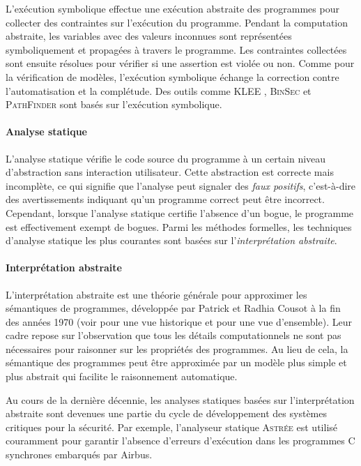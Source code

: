 {L'exécution symbolique  effectue une exécution abstraite des programmes pour collecter des contraintes sur l'exécution du programme. Pendant la computation abstraite, les variables avec des valeurs inconnues sont représentées symboliquement et propagées à travers le programme. Les contraintes collectées sont ensuite résolues pour vérifier si une assertion est violée ou non. Comme pour la vérification de modèles, l'exécution symbolique échange la correction contre l'automatisation et la complétude. Des outils comme \textsc{KLEE} , \textsc{BinSec}  et \textsc{PathFinder}  sont basés sur l'exécution symbolique.

\paragraph{Analyse statique}

L'analyse statique vérifie le code source du programme à un certain niveau d'abstraction sans interaction utilisateur. Cette abstraction est correcte mais incomplète, ce qui signifie que l'analyse peut signaler des \emph{faux positifs}, c'est-à-dire des avertissements indiquant qu'un programme correct peut être incorrect. Cependant, lorsque l'analyse statique certifie l'absence d'un bogue, le programme est effectivement exempt de bogues. Parmi les méthodes formelles, les techniques d'analyse statique les plus courantes sont basées sur l'\emph{interprétation abstraite}.

\paragraph{Interprétation abstraite}

L'interprétation abstraite  est une théorie générale pour approximer les sémantiques de programmes, développée par Patrick et Radhia Cousot à la fin des années 1970 (voir  pour une vue historique et  pour une vue d'ensemble). Leur cadre repose sur l'observation que tous les détails computationnels ne sont pas nécessaires pour raisonner sur les propriétés des programmes. Au lieu de cela, la sémantique des programmes peut être approximée par un modèle plus simple et plus abstrait qui facilite le raisonnement automatique.

Au cours de la dernière décennie, les analyses statiques basées sur l'interprétation abstraite sont devenues une partie du cycle de développement des systèmes critiques pour la sécurité. Par exemple, l'analyseur statique \textsc{Astrée}  est utilisé couramment pour garantir l'absence d'erreurs d'exécution dans les programmes C synchrones embarqués par Airbus.

}

